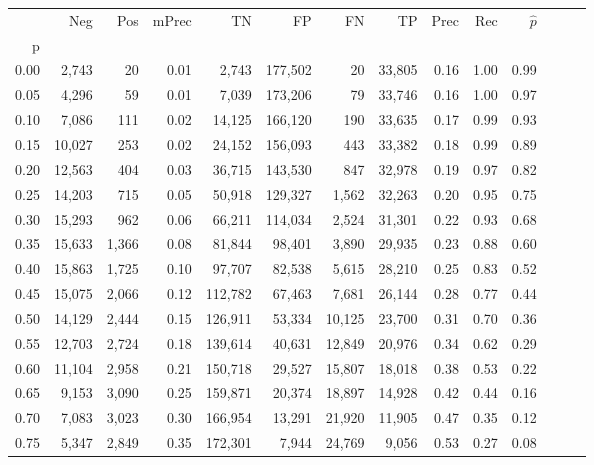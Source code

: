 \begin{tabular}{rrrrrrrrrrrrrr}
\toprule
{} &     Neg &    Pos & mPrec &       TN &       FP &      FN &      TP &  Prec &   Rec & $\hat{p}$ \\
p    &         &        &       &          &          &         &         &       &       &           \\
\midrule
0.00 &   2,743 &     20 &  0.01 &    2,743 &  177,502 &      20 &  33,805 &  0.16 &  1.00 &      0.99 \\
0.05 &   4,296 &     59 &  0.01 &    7,039 &  173,206 &      79 &  33,746 &  0.16 &  1.00 &      0.97 \\
0.10 &   7,086 &    111 &  0.02 &   14,125 &  166,120 &     190 &  33,635 &  0.17 &  0.99 &      0.93 \\
0.15 &  10,027 &    253 &  0.02 &   24,152 &  156,093 &     443 &  33,382 &  0.18 &  0.99 &      0.89 \\
0.20 &  12,563 &    404 &  0.03 &   36,715 &  143,530 &     847 &  32,978 &  0.19 &  0.97 &      0.82 \\
0.25 &  14,203 &    715 &  0.05 &   50,918 &  129,327 &   1,562 &  32,263 &  0.20 &  0.95 &      0.75 \\
0.30 &  15,293 &    962 &  0.06 &   66,211 &  114,034 &   2,524 &  31,301 &  0.22 &  0.93 &      0.68 \\
0.35 &  15,633 &  1,366 &  0.08 &   81,844 &   98,401 &   3,890 &  29,935 &  0.23 &  0.88 &      0.60 \\
0.40 &  15,863 &  1,725 &  0.10 &   97,707 &   82,538 &   5,615 &  28,210 &  0.25 &  0.83 &      0.52 \\
0.45 &  15,075 &  2,066 &  0.12 &  112,782 &   67,463 &   7,681 &  26,144 &  0.28 &  0.77 &      0.44 \\
0.50 &  14,129 &  2,444 &  0.15 &  126,911 &   53,334 &  10,125 &  23,700 &  0.31 &  0.70 &      0.36 \\
0.55 &  12,703 &  2,724 &  0.18 &  139,614 &   40,631 &  12,849 &  20,976 &  0.34 &  0.62 &      0.29 \\
0.60 &  11,104 &  2,958 &  0.21 &  150,718 &   29,527 &  15,807 &  18,018 &  0.38 &  0.53 &      0.22 \\
0.65 &   9,153 &  3,090 &  0.25 &  159,871 &   20,374 &  18,897 &  14,928 &  0.42 &  0.44 &      0.16 \\
0.70 &   7,083 &  3,023 &  0.30 &  166,954 &   13,291 &  21,920 &  11,905 &  0.47 &  0.35 &      0.12 \\
0.75 &   5,347 &  2,849 &  0.35 &  172,301 &    7,944 &  24,769 &   9,056 &  0.53 &  0.27 &      0.08 \\

\end{tabular}
